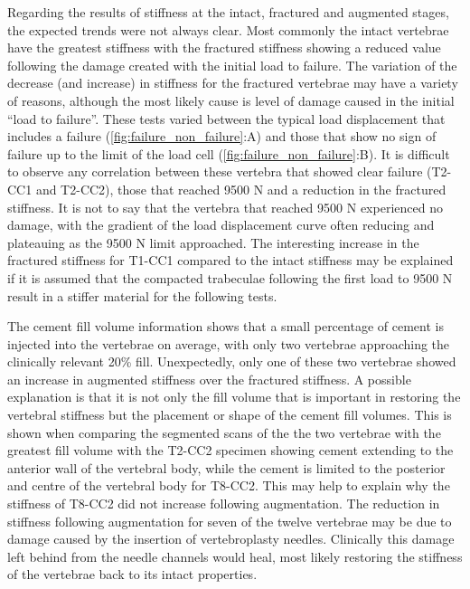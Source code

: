 
Regarding the results of stiffness at the intact, fractured and augmented
stages, the expected trends were not always clear.  Most commonly the intact
vertebrae have the greatest stiffness with the fractured stiffness showing a
reduced value following the damage created with the initial load to failure.
The variation of the decrease (and increase) in stiffness for the fractured
vertebrae may have a variety of reasons, although the most likely cause is
level of damage caused in the initial ``load to failure''.  These tests varied
between the typical load displacement that includes a failure
(\cref{fig:failure_non_failure}:A) and those that show no sign of failure up to
the limit of the load cell (\cref{fig:failure_non_failure}:B).  It is difficult
to observe any correlation between these vertebra that showed clear failure
(T2-CC1 and T2-CC2), those that reached 9500 N and a reduction in the fractured
stiffness.  It is not to say that the vertebra that reached 9500 N experienced
no damage, with the gradient of the load displacement curve often reducing and
plateauing as the 9500 N limit approached.  The interesting increase in the
fractured stiffness for T1-CC1 compared to the intact stiffness may be
explained if it is assumed that the compacted trabeculae following the first
load to 9500 N result in a stiffer material for the following tests.

The cement fill volume information shows that a small percentage of cement is
injected into the vertebrae on average, with only two vertebrae approaching the
clinically relevant 20\% fill.  Unexpectedly, only one of these two vertebrae
showed an increase in augmented stiffness over the fractured stiffness.  A
possible explanation is that it is not only the fill volume that is important
in restoring the vertebral stiffness but the placement or shape of the cement
fill volumes.  This is shown when comparing the segmented scans of the the two
vertebrae with the greatest fill volume with the T2-CC2 specimen showing cement
extending to the anterior wall of the vertebral body, while the cement is
limited to the posterior and centre of the vertebral body for T8-CC2.  This may
help to explain why the stiffness of T8-CC2 did not increase following
augmentation.  The reduction in stiffness following augmentation for seven of
the twelve vertebrae may be due to damage caused by the insertion of
vertebroplasty needles.  Clinically this damage left behind from the needle
channels would heal, most likely restoring the stiffness of the vertebrae back
to its intact properties.


